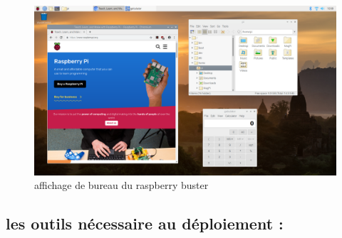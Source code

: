 \begin{figure}[H]
        \centering 
        \includegraphics[width=15cm]{figures/chap3/interface_rpi_buster.png}
         \caption{affichage de bureau du raspberry buster}
\end{figure} 
 



 \subsection{les outils nécessaire au déploiement :}
 

